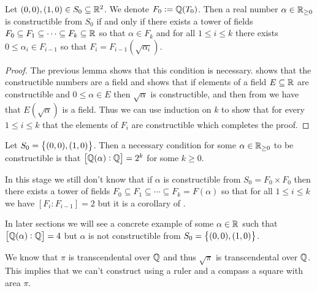 \documentclass[11pt,a4paper]{article}
\begin{document}
\begin{theorem}
  \label{thm:constructible-iff-tower-of-fields}
  Let $(0,0),(1,0) \in S_0 \subseteq \mathbb{R}^2$.
  We denote $F_0 := \mathbb{Q}(T_0)$.
  Then a real number $\alpha \in \mathbb{R}_{\geq 0}$ is constructible from $S_0$
  if and only if there exists a tower of fields
  $F_0 \subseteq F_1 \subseteq \cdots \subseteq F_k \subseteq \mathbb{R}$
  so that $\alpha \in F_k$ and for all $1 \le i \le k$
  there exists $0 \le \alpha_i \in F_{i-1}$ so that
  $F_i = F_{i-1}(\sqrt{\alpha_i})$.
\end{theorem}
\begin{proof}
  The previous lemma shows that this condition is necessary.
   shows that
  the constructible numbers are a field and 
  shows that if elements of a field $E \subseteq \mathbb{R}$ are constructible
  and $0 \le \alpha \in E$ then $\sqrt \alpha$ is constructible,
  and then from  we
  have that $E(\sqrt \alpha)$ is a field.
  Thus we can use induction on $k$ to show that for every $1 \le i \le k$
  that the elements of $F_i$ are constructible which completes the proof.
\end{proof}
\begin{corollary}
  \label{cor:necessary-condition-for-constructability}
  Let $S_0 = \left\{(0,0),(1,0)\right\}$.
  Then a necessary condition for some $\alpha \in \mathbb{R}_{\geq 0}$ to be
  constructible is that $\left[\mathbb{Q}(\alpha) : \mathbb{Q}\right] = 2^k$
  for some $k \geq 0$.
\end{corollary}

\begin{remark}
  In this stage we still don't know that if $\alpha$ is constructible
  from $S_0 = F_0 \times F_0$ then there exists a tower of fields
  $F_0 \subseteq F_1 \subseteq \cdots \subseteq F_k = F(\alpha)$
  so that for all $1 \le i \le k$ we have $\left[F_i : F_{i-1}\right] = 2$
  but it is a corollary of .
\end{remark}
\begin{remark}
  In later sections we will see a concrete example of some $\alpha \in \mathbb{R}$
  such that $\left[\mathbb{Q}(\alpha) : \mathbb{Q}\right] = 4$
  but $\alpha$ is not constructible from $S_0 = \left\{(0,0),(1,0)\right\}$.
\end{remark}

\begin{example}
  We know that $\pi$ is transcendental over $\mathbb{Q}$ and thus
  $\sqrt \pi$ is transcendental over $\mathbb{Q}$.
  This implies that we can't construct using a ruler and a compass
  a square with area $\pi$.
\end{example}
\end{document}
